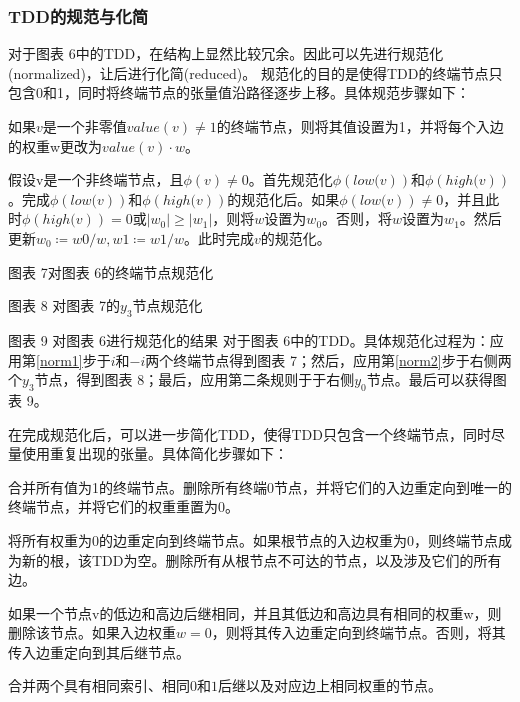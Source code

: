 \subsubsection{TDD的规范与化简}
对于图表 6中的TDD，在结构上显然比较冗余。因此可以先进行规范化(normalized)，让后进行化简(reduced)\citep{Hong_2022}。
规范化的目的是使得TDD的终端节点只包含0和1，同时将终端节点的张量值沿路径逐步上移。具体规范步骤如下：
\begin{myen}
    \item 如果$v$是一个非零值$value\left(v\right)\neq 1$的终端节点，则将其值设置为1，并将每个入边的权重w更改为$value\left(v\right)\cdot w$。\label{norm1}
    \item 假设v是一个非终端节点，且$\phi\left(v\right)\neq 0$。首先规范化$\phi\left.\left(low(v\right)\right)$和$\phi\left.\left(high(v\right)\right)$。完成$\phi\left.\left(low(v\right)\right)$和$\phi\left.\left(high(v\right)\right)$的规范化后。如果$\phi\left.\left(low(v\right)\right)\neq 0$，并且此时$\phi\left.\left(high(v\right)\right)=0$或$\left|w_0\right|\geq\left|w_1\right|$，则将$w$设置为$w_0$。否则，将$w$设置为$w_1$。然后更新$w_0≔w0/w,w1≔w1/w$。此时完成$v$的规范化。\label{norm2}
\end{myen}

 
图表 7对图表 6的终端节点规范化
 
图表 8 对图表 7的$y_3$节点规范化

图表 9 对图表 6进行规范化的结果
对于图表 6中的TDD。具体规范化过程为：应用第\ref{norm1}步于$i$和$-i$两个终端节点得到图表 7；然后，应用第\ref{norm2}步于右侧两个$y_3$节点，得到图表 8；最后，应用第二条规则于于右侧$y_0$节点。最后可以获得图表 9。

在完成规范化后，可以进一步简化TDD，使得TDD只包含一个终端节点，同时尽量使用重复出现的张量。具体简化步骤如下：
\begin{myen}
    \item 	合并所有值为1的终端节点。删除所有终端$0$节点，并将它们的入边重定向到唯一的终端节点，并将它们的权重重置为$0$。\label{sympl1}
	\item 将所有权重为$0$的边重定向到终端节点。如果根节点的入边权重为$0$，则终端节点成为新的根，该TDD为空。删除所有从根节点不可达的节点，以及涉及它们的所有边。\label{sympl2}
	\item 如果一个节点v的低边和高边后继相同，并且其低边和高边具有相同的权重w，则删除该节点。如果入边权重$w=0$，则将其传入边重定向到终端节点。否则，将其传入边重定向到其后继节点。\label{sympl3}
	\item 合并两个具有相同索引、相同$0$和$1$后继以及对应边上相同权重的节点。\label{sympl4}
\end{myen}

